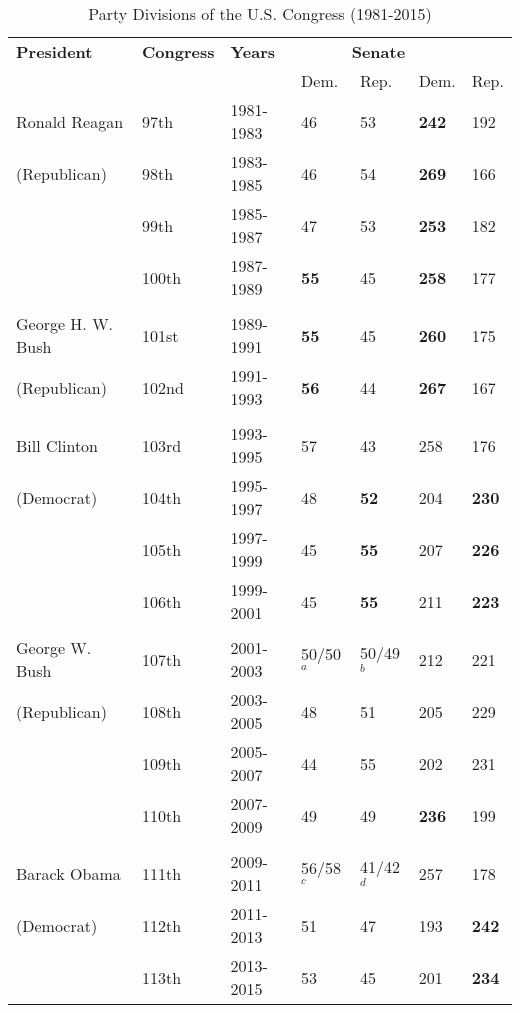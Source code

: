 \documentclass[12pt,a4paper]{article}
\begin{document}
\begin{table}[htbp]
\centering
\caption{Party Divisions of the U.S. Congress (1981-2015)\label{divided}}
\begin{tabular}{lllllll}
\hline\hline
	\textbf{President} & \textbf{Congress} & \textbf{Years} & \multicolumn{3}{c}{\textbf{Senate}}{\textbf{House}}\\
	\cline{4-5}\cline{6-7} &&&Dem.&Rep. & Dem.&Rep.\\
	
	 \hline
	Ronald Reagan  & 97th & 1981-1983 & 46 & 53 & \textbf{242} & 192 \\ 
	  (Republican) & 98th & 1983-1985 & 46 & 54 & \textbf{269} & 166    \\ 
	  & 99th & 1985-1987 & 47 & 53 & \textbf{253} & 182    \\ 
      & 100th & 1987-1989 & \textbf{55} & 45 & \textbf{258} & 177    \\ 
	  \\
	George H. W. Bush  & 101st & 1989-1991 & \textbf{55} & 45 & \textbf{260} & 175 \\
	 (Republican) & 102nd & 1991-1993 & \textbf{56} & 44 & \textbf{267} & 167    \\ 
	 \\
	Bill Clinton  & 103rd & 1993-1995 & 57 & 43 & 258 & 176 \\ 
	 (Democrat) & 104th & 1995-1997 & 48 & \textbf{52} & 204 & \textbf{230}    \\ 
	 & 105th & 1997-1999 & 45 & \textbf{55} & 207 & \textbf{226}    \\ 
	 & 106th & 1999-2001 & 45 & \textbf{55} & 211 & \textbf{223}    \\ 
	 \\
	George W. Bush  & 107th & 2001-2003 & 50/50$^{a}$ & 50/49$^{b}$ & 212 & 221 \\ 
	  (Republican) & 108th & 2003-2005 & 48 & 51 & 205 & 229    \\ 
	  & 109th & 2005-2007 & 44 & 55 & 202 & 231    \\ 
	  & 110th & 2007-2009 & 49 & 49 & \textbf{236} & 199    \\ 
	  \\
	Barack Obama  & 111th & 2009-2011 & 56/58$^{c}$ & 41/42$^{d}$ & 257 & 178 \\ 
	 (Democrat) & 112th & 2011-2013 & 51 & 47 & 193 & \textbf{242}    \\ 
	  & 113th & 2013-2015 & 53 & 45 & 201 & \textbf{234}    \\ 
	\hline
	\end{tabular}\\

\end{table}
\end{document}

